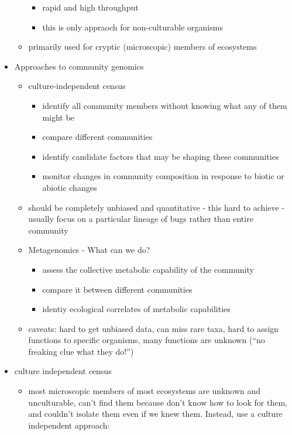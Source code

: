 \documentclass{article}
\begin{document}
\begin{itemize}
\begin{itemize}
            \begin{itemize}
                \item rapid and high throughput
                \item this is only appraoch for non-culturable organisms
            \end{itemize}
            \item primarily used for cryptic (microscopic) members of ecosystems
        \end{itemize}
        \item Approaches to community genomics
        \begin{itemize}
            \item culture-independent census
            \begin{itemize}
                \item identify all community members without knowing what any of them might be
                \item compare different communities
                \item identify candidate factors that may be shaping these communities
                \item monitor changes in community composition in response to biotic or abiotic changes
            \end{itemize}
            \item should be completely unbiased and quantitative - this hard to achieve - usually focus on a particular lineage of bugs rather than entire community
            \item Metagenomics - What can we do?
            \begin{itemize}
                \item assess the collective metabolic capability of the community
                \item compare it between different communities
                \item identiy ecological correlates of metabolic capabilities
            \end{itemize}
            \item caveats: hard to get unbiased data, can miss rare taxa, hard to assign functions to specific organisms, many functions are unknown (``no freaking clue what they do!'')
        \end{itemize}
        \item culture independent census
        \begin{itemize}
            \item most microscopic members of most ecosystems are unknown and unculturable, can't find them because don't know how to look for them, and couldn't isolate them even if we knew them.  Instead, use a culture independent approach:

\end{itemize}
\end{itemize}
\end{document}
